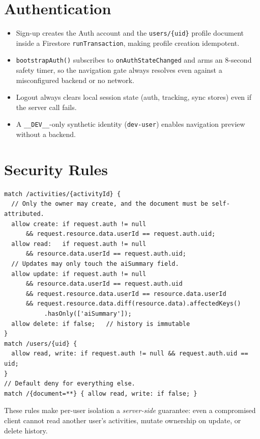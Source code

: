 \documentclass[11pt,a4paper]{report}
\begin{document}
\section{Authentication}
\begin{itemize}[nosep]
    \item Sign-up creates the Auth account and the \texttt{users/\{uid\}} profile document inside a Firestore \texttt{runTransaction}, making profile creation idempotent.
    \item \texttt{bootstrapAuth()} subscribes to \texttt{onAuthStateChanged} and arms an 8-second safety timer, so the navigation gate always resolves even against a misconfigured backend or no network.
    \item Logout always clears local session state (auth, tracking, sync stores) even if the server call fails.
    \item A \texttt{\_\_DEV\_\_}-only synthetic identity (\texttt{dev-user}) enables navigation preview without a backend.
\end{itemize}

\section{Security Rules}
\begin{lstlisting}[style=json, caption={Extract of \texttt{firestore.rules} (rules\_version 2)}, label={lst:rules}]
match /activities/{activityId} {
  // Only the owner may create, and the document must be self-attributed.
  allow create: if request.auth != null
      && request.resource.data.userId == request.auth.uid;
  allow read:   if request.auth != null
      && resource.data.userId == request.auth.uid;
  // Updates may only touch the aiSummary field.
  allow update: if request.auth != null
      && resource.data.userId == request.auth.uid
      && request.resource.data.userId == resource.data.userId
      && request.resource.data.diff(resource.data).affectedKeys()
           .hasOnly(['aiSummary']);
  allow delete: if false;   // history is immutable
}
match /users/{uid} {
  allow read, write: if request.auth != null && request.auth.uid == uid;
}
// Default deny for everything else.
match /{document=**} { allow read, write: if false; }
\end{lstlisting}

These rules make per-user isolation a \textit{server-side} guarantee: even a compromised client cannot read another user's activities, mutate ownership on update, or delete history.
\end{document}
